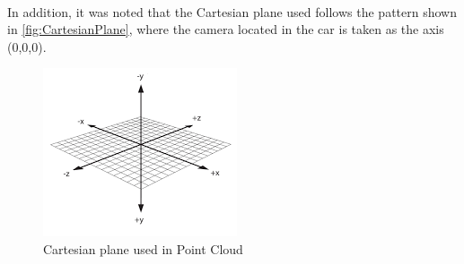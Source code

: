 \begin{figure}[H]
{    }
    \mbox{%
    \qquad
    }
    \mbox{%
    \qquad
    }
\end{figure}
    
    In addition, it was noted that the Cartesian plane used follows the pattern shown in \autoref{fig:CartesianPlane}, where the camera located in the car is taken as the axis (0,0,0).

    \begin{figure}[H]
    \caption{
        \label{fig:CartesianPlane}
        Cartesian plane used in Point Cloud
        }
        \begin{center}
        \includegraphics[scale=1]{images/eixos.png}
        \end{center}
    \end{figure}
    
